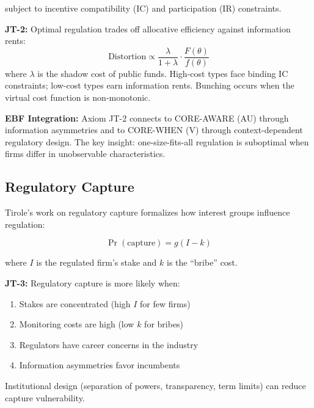 subject to incentive compatibility (IC) and participation (IR) constraints.

\begin{axiom}
\label{ax:jt-2}
\textbf{JT-2:} Optimal regulation trades off allocative efficiency against information rents:
\begin{equation}
\text{Distortion} \propto \frac{\lambda}{1+\lambda} \cdot \frac{F(\theta)}{f(\theta)}
\end{equation}
where $\lambda$ is the shadow cost of public funds. High-cost types face binding IC constraints; low-cost types earn information rents. Bunching occurs when the virtual cost function is non-monotonic.
\end{axiom}

\textbf{EBF Integration:} Axiom JT-2 connects to CORE-AWARE (AU) through information asymmetries and to CORE-WHEN (V) through context-dependent regulatory design. The key insight: one-size-fits-all regulation is suboptimal when firms differ in unobservable characteristics.

\subsection{Regulatory Capture}
\label{subsec:jt-capture}

Tirole's work on regulatory capture \citep{PAP-tirole_laffont_1988_politics_regulation} formalizes how interest groups influence regulation:

\begin{equation}
\Pr(\text{capture}) = g(I - k)
\label{eq:jt-capture}
\end{equation}

where $I$ is the regulated firm's stake and $k$ is the ``bribe'' cost.

\begin{axiom}
\label{ax:jt-3}
\textbf{JT-3:} Regulatory capture is more likely when:
\begin{enumerate}
    \item Stakes are concentrated (high $I$ for few firms)
    \item Monitoring costs are high (low $k$ for bribes)
    \item Regulators have career concerns in the industry
    \item Information asymmetries favor incumbents
\end{enumerate}
Institutional design (separation of powers, transparency, term limits) can reduce capture vulnerability.
\end{axiom}

